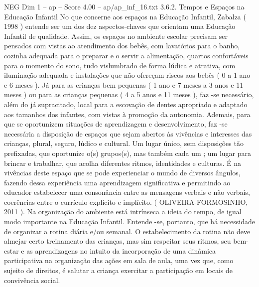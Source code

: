 \begin{textsample}{NEG Dim 1 – ap – Score 4.00 – ap/ap\_inf\_16.txt}  \label{ex:f1_neg_127}
3.6.2.
Tempos e Espaços na Educação Infantil No que concerne aos espaços na Educação Infantil, Zabalza ( 1998 ) entende ser um dos dez aspectos-chaves que orientam uma Educação Infantil de qualidade.
Assim, os espaços no ambiente escolar precisam ser pensados com vistas ao atendimento dos bebês, com lavatórios para o banho, cozinha adequada para o preparar e o servir a alimentação, quartos confortáveis para o momento do sono, tudo vislumbrado de forma lúdica e atrativa, com iluminação adequada e instalações que não ofereçam riscos aos bebês ( 0 a 1 ano e 6 meses ).
Já para as crianças bem pequenas ( 1 ano e 7 meses a 3 anos e 11 meses ) ou para as crianças pequenas ( 4 a 5 anos e 11 meses ), faz -se necessário, além do já supracitado, local para a escovação de dentes apropriado e adaptado aos tamanhos dos infantes, com vistas à promoção da autonomia.
Ademais, para que se oportunizem situações de aprendizagem e desenvolvimento, faz -se necessária a disposição de espaços que sejam abertos às vivências e interesses das crianças, plural, seguro, lúdico e cultural.
Um lugar único, sem disposições tão prefixadas, que oportunize o(s) grupos(s), mas também cada um ; um lugar para brincar e trabalhar, que acolha diferentes ritmos, identidades e culturas.
É na vivências deste espaço que se pode experienciar o mundo de diversos ângulos, fazendo dessa experiência uma aprendizagem significativa e permitindo ao educador estabelecer uma consonância entre as mensagens verbais e não verbais, coerências entre o currículo explícito e implícito. ( OLIVEIRA-FORMOSINHO, 2011 ).
Na organização do ambiente está intrínseca a ideia do tempo, de igual modo importante na Educação Infantil.
Entende -se, portanto, que há necessidade de organizar a rotina diária e/ou semanal.
O estabelecimento da rotina não deve almejar certo treinamento das crianças, mas sim respeitar seus ritmos, seu bem-estar e as aprendizagens no intuito da incorporação de uma dinâmica participativa na organização das ações em sala de aula, uma vez que, como sujeito de direitos, é salutar a criança exercitar a participação em locais de convivência social.

\end{textsample}
